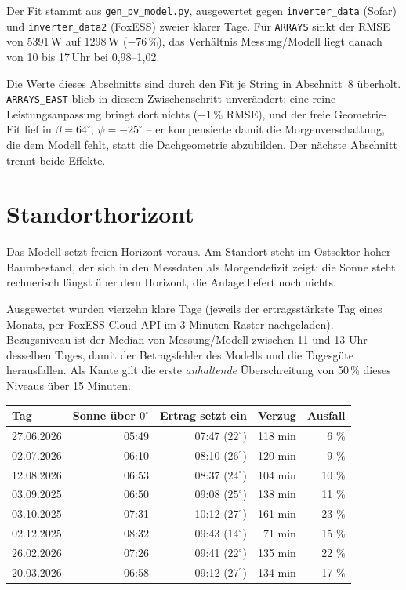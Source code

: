 \documentclass[11pt, a4paper]{article}
\begin{document}
Der Fit stammt aus \texttt{gen\_pv\_model.py}, ausgewertet gegen
\texttt{inverter\_data} (Sofar) und \texttt{inverter\_data2} (FoxESS) zweier klarer
Tage. Für \texttt{ARRAYS} sinkt der RMSE von 5391\,W auf 1298\,W ($-76\,\%$), das
Verhältnis Messung/Modell liegt danach von 10 bis 17\,Uhr bei 0{,}98--1{,}02.

Die Werte dieses Abschnitts sind durch den Fit je String in Abschnitt~8 überholt.
\texttt{ARRAYS\_EAST} blieb in diesem Zwischenschritt unverändert: eine reine
Leistungsanpassung bringt dort nichts ($-1\,\%$ RMSE), und der freie
Geometrie-Fit lief in $\beta = 64^\circ$, $\psi = -25^\circ$ -- er kompensierte
damit die Morgenverschattung, die dem Modell fehlt, statt die Dachgeometrie
abzubilden. Der nächste Abschnitt trennt beide Effekte.

\section{Standorthorizont}

Das Modell setzt freien Horizont voraus. Am Standort steht im Ostsektor hoher
Baumbestand, der sich in den Messdaten als Morgendefizit zeigt: die Sonne steht
rechnerisch längst über dem Horizont, die Anlage liefert noch nichts.

Ausgewertet wurden vierzehn klare Tage (jeweils der ertragsstärkste Tag eines
Monats, per FoxESS-Cloud-API im 3-Minuten-Raster nachgeladen). Bezugsniveau ist
der Median von Messung/Modell zwischen 11 und 13 Uhr desselben Tages, damit der
Betragsfehler des Modells und die Tagesgüte herausfallen. Als Kante gilt die
erste \emph{anhaltende} Überschreitung von 50\,\% dieses Niveaus über 15 Minuten.

\begin{center}
\begin{tabular}{lrrrr}
\toprule
Tag & Sonne über $0^\circ$ & Ertrag setzt ein & Verzug & Ausfall\\
\midrule
27.06.2026 & 05:49 & 07:47 ($22^\circ$) & 118 min & 6 \%\\
02.07.2026 & 06:10 & 08:10 ($26^\circ$) & 120 min & 9 \%\\
12.08.2026 & 06:53 & 08:37 ($24^\circ$) & 104 min & 10 \%\\
03.09.2025 & 06:50 & 09:08 ($25^\circ$) & 138 min & 11 \%\\
03.10.2025 & 07:31 & 10:12 ($27^\circ$) & 161 min & 23 \%\\
02.12.2025 & 08:32 & 09:43 ($14^\circ$) & 71 min & 15 \%\\
26.02.2026 & 07:26 & 09:41 ($22^\circ$) & 135 min & 22 \%\\
20.03.2026 & 06:58 & 09:12 ($27^\circ$) & 134 min & 17 \%\\
\bottomrule
\end{tabular}
\end{center}
\end{document}
